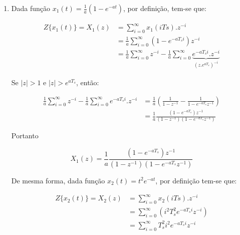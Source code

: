 \begin{enumerate}
\begin{itemize}
            \end{itemize}
        
        \item\label{item:ex2b} %
        
        Dada função $x_1(t) = \frac{1}{a} \left( 1 - e^{-at} \right)$, por definição, tem-se que:
        
        	\begin{equation}
            	\begin{split}
                	Z\{x_1(t)\} = X_1(z) & = \sum_{i=0}^{\infty} x_1(i Ts).z^{-i} \\
                	& = \frac{1}{a} \sum_{i=0}^{\infty} \left( 1 - e^{-a T_s i} \right)z^{-i} \\
                	& = \frac{1}{a} \sum_{i=0}^{\infty} z^{-i} - \frac{1}{a} \sum_{i=0}^{\infty} \underbrace{e^{-a T_s i}.z^{-i}}_{(z.e^{aT_s})^{-i}}
            	\end{split}
        	\end{equation}
        
        Se $|z| > 1$ e $|z| > e^{aT_s}$, então:
        	
        	\begin{equation}
            	\begin{split}
                	\frac{1}{a} \sum_{i=0}^{\infty} z^{-i} - \frac{1}{a} \sum_{i=0}^{\infty} e^{-a T_s i}.z^{-i} & = \frac{1}{a} (\frac{1}{1-z^ {-1}} - \frac{1}{1-e^{-aT_s} z^ {-1}}) \\
                	& = \frac{1}{a} \frac{(1 - e^{-aT_s})z^{-1}}{(1-z^{-1})(1-e^{-aT_s} z^ {-1})}
            	\end{split}
        	\end{equation}
        	
        Portanto
        	
        	\begin{equation}
            	X_1(z) = \frac{1}{a}  \frac{(1 - e^{-aT_s})z^{-1}}{(1-z^{-1})(1-e^{-aT_s} z^{-1})}
        	\end{equation}
        
        De mesma forma, dada função $x_2(t) = t^2 e^{-a t}$, por definição tem-se que:
        
        	\begin{equation}
            	\begin{split}
                	Z\{x_2(t)\} = X_2(z) & = \sum_{i=0}^{\infty} x_2(i Ts).z^{-i} \\
                	& = \sum_{i=0}^{\infty} \left( i^2 T_s^2 e^{-a T_s i} z^{-i} \right) \\
                	& = \sum_{i=0}^{\infty} T_s^2 i^2 e^{-a T_s i} z^{-i}
            	\end{split}
        	\end{equation}
        	

\end{enumerate}
